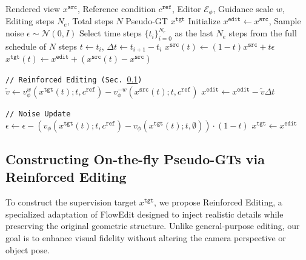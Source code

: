 \documentclass[runningheads]{llncs}
\begin{document}
\begin{algorithm}[t]
    \caption{Reinforced Editing}
    \label{alg:red}
    \begin{algorithmic}[1]
    \Require Rendered view $x^{\texttt{src}}$, Reference condition $c^{\texttt{ref}}$, Editor $\mathcal{E}_\phi$, Guidance scale $w$, Editing steps $N_e$, Total steps $N$
    \Ensure Pseudo-GT $x^{\texttt{tgt}}$
    \State Initialize $x^{\texttt{edit}} \leftarrow x^{\texttt{src}}$, Sample noise $\epsilon \sim \mathcal{N}(0, I)$
    \State Select time steps $\{t_i\}_{i=0}^{N_e}$ as the last $N_e$ steps from the full schedule of $N$ steps
     
        \State $t \leftarrow t_i$, $\Delta t \leftarrow t_{i+1} - t_i$
        \State $x^{\texttt{src}}(t) \leftarrow (1-t)x^{\texttt{src}} + t\epsilon$
        \State $x^{\texttt{tgt}}(t) \leftarrow x^{\texttt{edit}} + (x^{\texttt{src}}(t) - x^{\texttt{src}})$ 
        
        \Statex \texttt{// Reinforced Editing (Sec.~\ref{sec:reinforced_editing})}
        \State $\tilde{v} \leftarrow v_\phi^{w}(x^{\texttt{tgt}}(t); t, c^{\texttt{ref}}) - v_\phi^{-w}(x^{\texttt{src}}(t); t, c^{\texttt{ref}})$ 
        \State $x^{\texttt{edit}} \leftarrow x^{\texttt{edit}} - \tilde{v} \Delta t$ 
    
        \Statex \texttt{// Noise Update}
        \State $\epsilon \leftarrow \epsilon - (v_\phi(x^{\texttt{tgt}}(t); t, c^{\texttt{ref}}) - v_\phi(x^{\texttt{tgt}}(t); t, \emptyset)) \cdot (1-t)$ 
    \EndFor
    \State \Return $x^{\texttt{tgt}} \leftarrow x^{\texttt{edit}}$
    \end{algorithmic}
    \end{algorithm}


\subsection{Constructing On-the-fly Pseudo-GTs via Reinforced Editing}
\label{sec:reinforced_editing}

To construct the supervision target $x^{\texttt{tgt}}$, we propose Reinforced Editing, a specialized adaptation of FlowEdit designed to inject realistic details while preserving the original geometric structure.
Unlike general-purpose editing, our goal is to enhance visual fidelity without altering the camera perspective or object pose.
\end{document}
